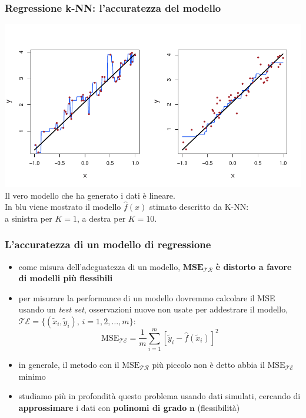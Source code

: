 \begin{frame}

	\frametitle{Regressione k-NN: l'accuratezza del modello}

	\begin{center}
		\includegraphics[scale=0.7]{images/supervised/knn_regression/3_17.pdf}\\
		Il vero modello che ha generato i dati è lineare.\\
		In blu viene mostrato il modello $\widehat{f}(x)$ stimato descritto da K-NN:\\
		a sinistra per $K=1$, a destra per $K=10$.
	\end{center}
\end{frame}


\begin{frame}

	\frametitle{L'accuratezza di un modello di regressione}

	\begin{itemize}
		\item come misura dell'adeguatezza di un modello, $\pmb{\mbox{MSE}_{\mathcal{TR}}}$ \textbf{è distorto a favore di modelli più flessibili}
		\item per misurare la performance di un modello dovremmo calcolare il MSE usando un \emph{test set}, osservazioni nuove non usate per addestrare il modello, $\mathcal{TE} = \{(\widetilde x_i,\widetilde y_i),\,i=1,2,\ldots,m\}$:
			\[
				\mbox{MSE}_{\mathcal{TE}} = \frac{1}{m}\sum_{i=1}^m [\widetilde y_i-\widehat f(\widetilde x_i)]^2
			\]
		\item in generale, il metodo con il $\mbox{MSE}_{\mathcal{TR}}$ più piccolo non è detto abbia il $\mbox{MSE}_{\mathcal{TE}}$ minimo
		\item studiamo più in profondità questo problema usando dati simulati, cercando di \textbf{approssimare} i dati con \textbf{polinomi di grado} $\pmb{n}$ (flessibilità)
	\end{itemize}
\end{frame}


